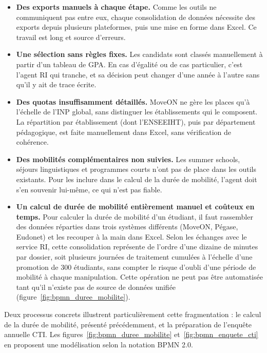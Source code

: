 \begin{itemize}
    \item \textbf{Des exports manuels à chaque étape.} Comme les outils ne communiquent pas entre eux, chaque consolidation de données nécessite des exports depuis plusieurs plateformes, puis une mise en forme dans Excel. Ce travail est long et source d'erreurs.

    \item \textbf{Une sélection sans règles fixes.} Les candidats sont classés manuellement à partir d'un tableau de GPA. En cas d'égalité ou de cas particulier, c'est l'agent RI qui tranche, et sa décision peut changer d'une année à l'autre sans qu'il y ait de trace écrite.

    \item \textbf{Des quotas insuffisamment détaillés.} MoveON ne gère les places qu'à l'échelle de l'INP global, sans distinguer les établissements qui le composent. La répartition par établissement (dont l'ENSEEIHT), puis par département pédagogique, est faite manuellement dans Excel, sans vérification de cohérence.

    \item \textbf{Des mobilités complémentaires non suivies.} Les summer schools, séjours linguistiques et programmes courts n'ont pas de place dans les outils existants. Pour les inclure dans le calcul de la durée de mobilité, l'agent doit s'en souvenir lui-même, ce qui n'est pas fiable.

    \item \textbf{Un calcul de durée de mobilité entièrement manuel et coûteux en temps.} Pour calculer la durée de mobilité d'un étudiant, il faut rassembler des données réparties dans trois systèmes différents (MoveON, Pégase, Eudonet) et les recouper à la main dans Excel. Selon les échanges avec le service RI, cette consolidation représente de l'ordre d'une dizaine de minutes par dossier, soit plusieurs journées de traitement cumulées à l'échelle d'une promotion de 300 étudiants, sans compter le risque d'oubli d'une période de mobilité à chaque manipulation. Cette opération ne peut pas être automatisée tant qu'il n'existe pas de source de données unifiée (figure~\ref{fig:bpmn_duree_mobilite}).
\end{itemize}

Deux processus concrets illustrent particulièrement cette fragmentation : le calcul de la durée de mobilité, présenté précédemment, et la préparation de l'enquête annuelle CTI. Les figures~\ref{fig:bpmn_duree_mobilite} et~\ref{fig:bpmn_enquete_cti} en proposent une modélisation selon la notation BPMN 2.0.

